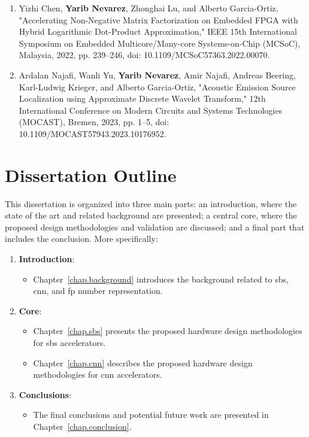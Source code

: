 \begin{enumerate}
	\item Yizhi Chen, \textbf{Yarib Nevarez}, Zhonghai Lu, and Alberto Garcia-Ortiz, "Accelerating Non-Negative Matrix Factorization on Embedded FPGA with Hybrid Logarithmic Dot-Product Approximation," 
	 IEEE 15th International Symposium on Embedded Multicore/Many-core Systems-on-Chip (MCSoC), Malaysia, 2022, pp. 239--246, doi: 10.1109/MCSoC57363.2022.00070.
	
	\item Ardalan Najafi, Wanli Yu, \textbf{Yarib Nevarez}, Amir Najafi, Andreas Beering, Karl-Ludwig Krieger, and Alberto Garcia-Ortiz, "Acoustic Emission Source Localization using Approximate Discrete Wavelet Transform,"  12th International Conference on Modern Circuits and Systems Technologies (MOCAST), Bremen, 2023, pp. 1--5, doi: 10.1109/MOCAST57943.2023.10176952.
	
\end{enumerate}

\section{Dissertation Outline}

This dissertation is organized into three main parts: an introduction, where the state of the art and related background are presented; a central core, where the proposed design methodologies and validation are discussed; and a final part that includes the conclusion. More specifically:

\begin{enumerate}[I]
	\item \textbf{Introduction}: 
	\begin{itemize}
		\item Chapter~\ref{chap.background} introduces the background related to \gls{sbs}, \gls{cnn}, and \gls{fp} number representation.
	\end{itemize}
	
	\item \textbf{Core}: 
	\begin{itemize}
		\item Chapter~\ref{chap.sbs} presents the proposed hardware design methodologies for \gls{sbs} accelerators.
		\item Chapter~\ref{chap.cnn} describes the proposed hardware design methodologies for \gls{cnn} accelerators.
	\end{itemize}
	
	\item \textbf{Conclusions}: 
	\begin{itemize}
		\item The final conclusions and potential future work are presented in Chapter~\ref{chap.conclusion}.
	\end{itemize}
\end{enumerate}
